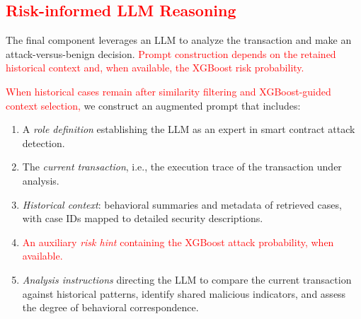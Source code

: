 \subsection{\textcolor{red}{Risk-informed LLM Reasoning}}

\label{sec:reasoning}

The final component leverages an LLM to analyze the transaction and make an attack-versus-benign decision. \textcolor{red}{Prompt construction depends on the retained historical context and, when available, the XGBoost risk probability.}


\textcolor{red}{When historical cases remain after similarity filtering and XGBoost-guided context selection,} we construct an augmented prompt that includes:

\begin{enumerate}
    \item A \textit{role definition} establishing the LLM as an expert in smart contract attack detection.
    \item The \textit{current transaction}, i.e., the execution trace of the transaction under analysis.
    \item \textit{Historical context}: behavioral summaries and metadata of retrieved cases, with case IDs mapped to detailed security descriptions.
    \item \textcolor{red}{An auxiliary \textit{risk hint} containing the XGBoost attack probability, when available.}
    \item \textit{Analysis instructions} directing the LLM to compare the current transaction against historical patterns, identify shared malicious indicators, and assess the degree of behavioral correspondence.
\end{enumerate}

